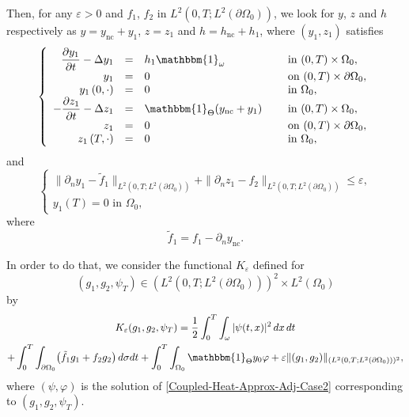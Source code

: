 \documentclass[10pt,a4paper]{amsart}
\newcommand{\nc}{\mathrm{nc}}
\newcommand{\norm}[1]{\Vert#1\Vert}
\theoremstyle{definition}
\begin{document}
Then, for any $\varepsilon >0$ and $f_1$, $f_2$ in $L^2(0,T; L^2(\partial \Omega_0))$, we look for $y$, $z$ and $h$ respectively as $y = y_{\nc} + y_1$, $z = z_1$ and $h = h_{\nc} + h_1$, where $(y_1, z_1)$ satisfies
\begin{equation}
\label{y-Omega-1-h}
\left\{
\begin{array}{rcll}
\dfrac{\partial y_1}{\partial t}-\Delta y_1 &=&h_1\mathbbm{1}_{\omega}&\text{ in }(0,T) \times \Omega_0,
\\
y_1 &=& 0 &\text{ on }(0,T) \times \partial \Omega_0,
\\
y_1\left(0,\cdot\right) &=& 0 &\text{ in }\Omega_0,
\\
-\dfrac{\partial z_1}{\partial t}-\Delta z_1 &=&\mathbbm{1}_{\Theta} (y_{\nc} + y_1) \quad&\text{ in }(0,T) \times \Omega_0,
\\
z_1 &=& 0 &\text{ on }(0,T) \times \partial \Omega_0,
\\
z_1\left(T,\cdot\right) &=& 0 &\text{ in }\Omega_0,
\end{array}
\right.
\end{equation}
and
\begin{equation}
\label{Goal-NC-and-Approx-Case-2}
\begin{cases}
\| \partial_n y_1 - \tilde f_1 \|_{L^2(0,T; L^2(\partial\Omega_0))}
+
\| \partial_n z_1 - f_2 \|_{L^2(0,T; L^2(\partial\Omega_0))}
\leq\varepsilon,
\\
y_1(T) = 0 \text{ in } \Omega_0,
\end{cases}
\end{equation}
where
\begin{equation}\label{tilf}
\tilde f_1= f_1 - \partial_n y_{\nc}.
\end{equation}

In order to do that, we consider the functional $K_\varepsilon$ defined for
\[
(g_1, g_2, \psi_T) \in (L^2(0,T; L^2(\partial \Omega_0)))^2 \times L^2(\Omega_0)
\]
by
\begin{multline*}
K_{\varepsilon}(g_1, g_2, \psi_T)
=
\frac{1}{2} \int_0^T \int_\omega |\psi(t,x)|^2 \, dx\,dt
\\
+
\int_0^T \int_{\partial \Omega_0} \bigl(\tilde f_1 g_1 + f_2 g_2 \bigr) \, d\sigma dt
+
\int_0^T \int_{\Omega_0} \mathbbm{1}_{\Theta} y_0 \varphi
+
\varepsilon \norm{(g_1,g_2)}_{(L^2(0,T; L^2(\partial \Omega_0)))^2},
\end{multline*}
where $(\psi, \varphi)$ is the solution of \eqref{Coupled-Heat-Approx-Adj-Case2} {corresponding to $(g_1, g_2, \psi_T)$.}
\end{document}

